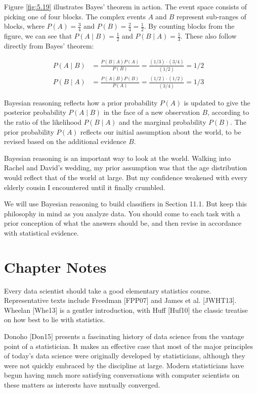 \documentclass[10pt]{article}
\begin{document}
Figure \ref{fig:5.19} illustrates Bayes' theorem in action. The event space consists of picking one of four blocks. The complex events $A$ and $B$ represent sub-ranges of blocks, where $P(A)=\frac{3}{4}$ and $P(B)=\frac{2}{4}=\frac{1}{2}$. By counting blocks from the figure, we can see that $P(A \mid B)=\frac{1}{2}$ and $P(B \mid A)=\frac{1}{3}$. These also follow directly from Bayes' theorem:

\begin{align*}
P(A \mid B)&=\frac{P(B \mid A) P(A)}{P(B)}=\frac{(1/3) \cdot (3/4)}{(1/2)}=1/2 \\
P(B \mid A)&=\frac{P(A \mid B) P(B)}{P(A)}=\frac{(1/2) \cdot (1/2)}{(3/4)}=1/3
\end{align*}

Bayesian reasoning reflects how a prior probability $P(A)$ is updated to give the posterior probability $P(A \mid B)$ in the face of a new observation $B$, according to the ratio of the likelihood $P(B \mid A)$ and the marginal probability $P(B)$. The prior probability $P(A)$ reflects our initial assumption about the world, to be revised based on the additional evidence $B$.

Bayesian reasoning is an important way to look at the world. Walking into Rachel and David's wedding, my prior assumption was that the age distribution would reflect that of the world at large. But my confidence weakened with every elderly cousin I encountered until it finally crumbled.

We will use Bayesian reasoning to build classifiers in Section 11.1. But keep this philosophy in mind as you analyze data. You should come to each task with a prior conception of what the answers should be, and then revise in accordance with statistical evidence.

\section{Chapter Notes}
Every data scientist should take a good elementary statistics course. Representative texts include Freedman [FPP07] and James et al. [JWHT13]. Wheelan [Whe13] is a gentler introduction, with Huff [Huf10] the classic treatise on how best to lie with statistics.

Donoho [Don15] presents a fascinating history of data science from the vantage point of a statistician. It makes an effective case that most of the major principles of today's data science were originally developed by statisticians, although they were not quickly embraced by the discipline at large. Modern statisticians have begun having much more satisfying conversations with computer scientists on these matters as interests have mutually converged.
\end{document}
